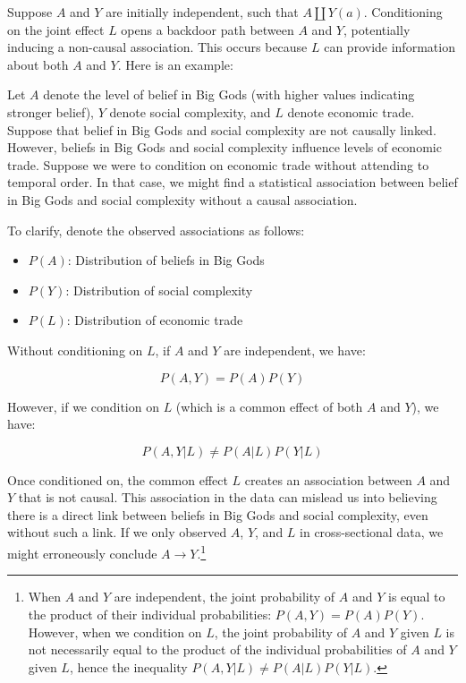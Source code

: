 \documentclass[
  singlecolumn]{article}
\providecommand{\tightlist}{%
  \setlength{\itemsep}{0pt}\setlength{\parskip}{0pt}}\usepackage{longtable,booktabs,array}
\begin{document}
Suppose \(A\) and \(Y\) are initially independent, such that
\(A \coprod Y(a)\). Conditioning on the joint effect \(L\) opens a
backdoor path between \(A\) and \(Y\), potentially inducing a non-causal
association. This occurs because \(L\) can provide information about
both \(A\) and \(Y\). Here is an example:

Let \(A\) denote the level of belief in Big Gods (with higher values
indicating stronger belief), \(Y\) denote social complexity, and \(L\)
denote economic trade. Suppose that belief in Big Gods and social
complexity are not causally linked. However, beliefs in Big Gods and
social complexity influence levels of economic trade. Suppose we were to
condition on economic trade without attending to temporal order. In that
case, we might find a statistical association between belief in Big Gods
and social complexity without a causal association.

To clarify, denote the observed associations as follows:

\begin{itemize}
\tightlist
\item
  \(P(A)\): Distribution of beliefs in Big Gods
\item
  \(P(Y)\): Distribution of social complexity
\item
  \(P(L)\): Distribution of economic trade
\end{itemize}

Without conditioning on \(L\), if \(A\) and \(Y\) are independent, we
have:

\[P(A, Y) = P(A)P(Y)\]

However, if we condition on \(L\) (which is a common effect of both
\(A\) and \(Y\)), we have:

\[P(A, Y | L) \neq P(A | L)P(Y | L)\]

Once conditioned on, the common effect \(L\) creates an association
between \(A\) and \(Y\) that is not causal. This association in the data
can mislead us into believing there is a direct link between beliefs in
Big Gods and social complexity, even without such a link. If we only
observed \(A\), \(Y\), and \(L\) in cross-sectional data, we might
erroneously conclude \(A \to Y\).\footnote{When \(A\) and \(Y\) are
  independent, the joint probability of \(A\) and \(Y\) is equal to the
  product of their individual probabilities: \(P(A, Y) = P(A)P(Y)\).
  However, when we condition on \(L\), the joint probability of \(A\)
  and \(Y\) given \(L\) is not necessarily equal to the product of the
  individual probabilities of \(A\) and \(Y\) given \(L\), hence the
  inequality \(P(A, Y | L) \neq P(A | L)P(Y | L)\).}
\end{document}
